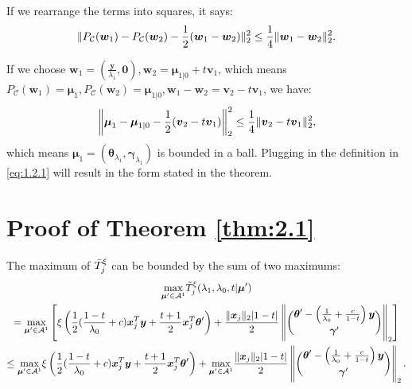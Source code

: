 If we rearrange the terms into squares, it says:
\begin{equation}
    \lVert P_{\mathcal{C}}(\boldsymbol w_1)-P_{\mathcal{C}}(\boldsymbol w_2)-\frac{1}{2}(\boldsymbol w_1-\boldsymbol w_2)\rVert_2^2\leq\frac{1}{4}\lVert\boldsymbol w_1-\boldsymbol w_2\rVert_2^2.
\end{equation}

If we choose $\boldsymbol w_1=(\frac{\boldsymbol y}{\lambda_1},\boldsymbol0),\boldsymbol w_2=\boldsymbol\mu_{1|0}+t\boldsymbol v_1$, which means $P_{\mathcal{C}}(\boldsymbol w_1)=\boldsymbol\mu_1,P_{\mathcal{C}}(\boldsymbol w_2)=\boldsymbol\mu_{1|0},\boldsymbol w_1-\boldsymbol w_2=\boldsymbol v_2-t\boldsymbol v_1$, we have:
\begin{equation}
    \left\Vert\boldsymbol\mu_1-\boldsymbol\mu_{1|0}-\frac{1}{2}(\boldsymbol v_2-t\boldsymbol v_1)\right\Vert_2^2\leq\frac{1}{4}\lVert\boldsymbol v_2-t\boldsymbol v_1\rVert_2^2,
\end{equation}
which means $\boldsymbol\mu_1=(\boldsymbol\theta_{\lambda_1},\boldsymbol\gamma_{\lambda_1})$ is bounded in a ball. Plugging in the definition in \eqref{eq:1.2.1} will result in the form stated in the theorem.

\section{Proof of Theorem \ref{thm:2.1}}

The maximum of $\Tilde{T}^\xi_j$ can be bounded by the sum of two maximums:
\begin{equation}
    \begin{gathered}
        \underset{\boldsymbol\mu'\in\mathcal{A}^1}{\mathrm{max}}\Tilde{T}^\xi_j(\lambda_1,\lambda_0,t|\boldsymbol\mu')\\
        =\underset{\boldsymbol\mu'\in\mathcal{A}^1}{\mathrm{max}}\left[\xi\left( \frac{1}{2}(\frac{1-t}{\lambda_0}+c)\boldsymbol x_j^T\boldsymbol y+\frac{t+1}{2}\boldsymbol x_j^T\boldsymbol\theta'\right)+\frac{\lVert\boldsymbol x_j\rVert_2|1-t|}{2}\left\Vert\binom{\boldsymbol\theta'-\left(\frac{1}{\lambda_0}+\frac{c}{1-t}\right)\boldsymbol y}{\boldsymbol\gamma'}\right\Vert_2\right]\\
        \leq \underset{\boldsymbol\mu'\in\mathcal{A}^1}{\mathrm{max}}\xi\left( \frac{1}{2}(\frac{1-t}{\lambda_0}+c)\boldsymbol x_j^T\boldsymbol y+\frac{t+1}{2}\boldsymbol x_j^T\boldsymbol\theta'\right)+\underset{\boldsymbol\mu'\in\mathcal{A}^1}{\mathrm{max}}\frac{\lVert\boldsymbol x_j\rVert_2|1-t|}{2}\left\Vert\binom{\boldsymbol\theta'-\left(\frac{1}{\lambda_0}+\frac{c}{1-t}\right)\boldsymbol y}{\boldsymbol\gamma'}\right\Vert_2.
    \end{gathered}
\end{equation}

